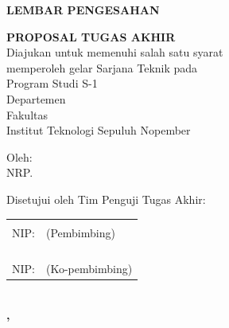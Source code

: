 \setcounter{page}{2}

\setlength{\parskip}{8pt}

\fancyfoot[L]{}
\fancyfoot[C]{}
\fancyfoot[R]{\hspace{-1cm}\thepage}

\vspace{6pt}
\begin{center}
  \fontsize{14}{16.8}\selectfont
  \textbf{LEMBAR PENGESAHAN}
\end{center}
\vspace{18pt}

\begin{center}
  \textbf{\tatitle{}}
\end{center}

\begingroup
\small    

\begin{center}
  \textbf{PROPOSAL TUGAS AKHIR}
  \\Diajukan untuk memenuhi salah satu syarat \\
  memperoleh gelar Sarjana Teknik pada \\
  Program Studi S-1 \studyprogram{} \\
  Departemen \department{} \\
  Fakultas \faculty{} \\
  Institut Teknologi Sepuluh Nopember
\end{center}

\begin{center}
  Oleh: \textbf{\name{}}
  \\NRP. \nrp{}
\end{center}

\begin{center}
  Disetujui oleh Tim Penguji Tugas Akhir:
\end{center}

\vspace{2\baselineskip}

\begingroup
\setlength{\tabcolsep}{0pt}

\noindent
\begin{tabularx}{\textwidth}{X l}
  \advisor{} & \\ NIP: \advisornip{} & (Pembimbing) \\ & \\ & \\ & \\
  \coadvisor{} & \\ NIP: \coadvisornip{} & (Ko-pembimbing) \\
\end{tabularx}
\endgroup

\begin{center}
  \textbf{\MakeUppercase{\place{}}\\\MONTH{}, \the\year{}}
\end{center}
\endgroup

